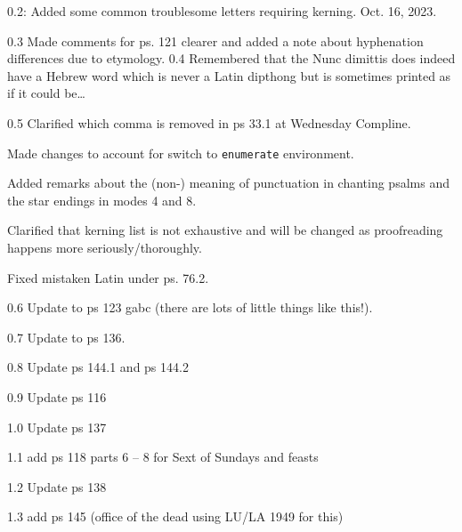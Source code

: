 \documentclass[11pt]{article}
\begin{document}
0.2: Added some common troublesome letters requiring kerning. Oct. 16, 2023. 

0.3 Made comments for ps. 121 clearer and added a note about hyphenation differences due to etymology.
0.4 Remembered that the Nunc dimittis does indeed have a Hebrew word which is never a Latin dipthong but is sometimes printed as if it could be…

0.5 Clarified which comma is removed in ps 33.1 at Wednesday Compline. 

Made changes to account for switch to \verb|enumerate| environment.

Added remarks about the (non-) meaning of punctuation in chanting psalms and the star endings in modes 4 and 8.

Clarified that kerning list is not exhaustive and will be changed as proofreading happens more seriously/thoroughly.

Fixed mistaken Latin under ps. 76.2.

0.6 Update to ps 123 gabc (there are lots of little things like this!).

0.7 Update to ps 136.

0.8 Update ps 144.1 and ps 144.2

0.9 Update ps 116

1.0 Update ps 137

1.1 add ps 118 parts 6 – 8 for Sext of Sundays and feasts

1.2 Update ps 138

1.3 add ps 145 (office of the dead using LU/LA 1949 for this)
\end{document}
